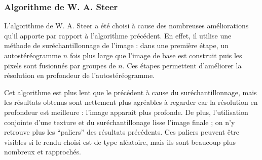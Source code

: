   \subsubsection{Algorithme de W. A. Steer}
  
  L'algorithme de W. A. Steer a été choisi à cause des nombreuses améliorations qu'il apporte par rapport à l'algorithme précédent. En effet, il utilise une méthode de suréchantillonnage de l'image : dans une première étape, un autostéréogramme $n$ fois plus large que l'image de base est construit puis les pixels sont fusionnés par groupes de $n$. Ces étapes permettent d'améliorer la résolution en profondeur de l'autostéréogramme.
  
  Cet algorithme est plus lent que le précédent à cause du suréchantillonnage, mais les résultats obtenus sont nettement plus agréables à regarder car la résolution en profondeur est meilleure : l'image apparaît plus profonde. De plus, l'utilisation conjointe d'une texture et du suréchantillonage lisse l'image finale ; on n'y retrouve plus les ``paliers'' des résultats précédents. Ces paliers peuvent être visibles si le rendu choisi est de type aléatoire, mais ils sont beaucoup plus nombreux et rapprochés.
